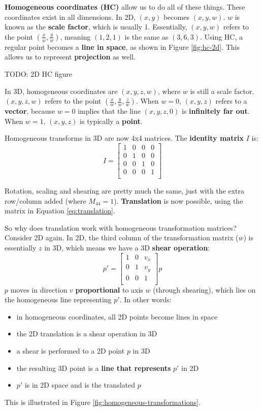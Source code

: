 \documentclass{article}
\begin{document}
\textbf{Homogeneous coordinates (HC)} allow us to do all of these things. These coordinates exist in all dimensions. In 2D, $(x, y)$ becomes $(x, y, w)$. $w$ is known as the \textbf{scale factor}, which is usually 1. Essentially, $(x, y, w)$ refers to the point $(\frac{x}{w}, \frac{y}{w})$, meaning $(1, 2, 1)$ is the same as $(3, 6, 3)$. Using HC, a regular point becomes a \textbf{line in space}, as shown in Figure \ref{fig:hc-2d}. This allows us to represent \textbf{projection} as well.

TODO: 2D HC figure

In 3D, homogeneous coordinates are $(x, y, z, w)$, where $w$ is still a scale factor. $(x, y, z, w)$ refers to the point $(\frac{x}{w}, \frac{y}{w},\frac{z}{w})$. When $w = 0$, $(x,y,z)$ refers to a \textbf{vector}, because $w = 0$ implies that the line $(x, y, z, 0)$ is \textbf{infinitely far out}. When $w = 1$, $(x, y, z)$ is typically a \textbf{point}.

Homogeneous transforms in 3D are now 4x4 matrices. The \textbf{identity matrix} $I$ is:
\begin{equation}
	I = \left[ \begin{matrix}
	1 & 0 & 0 & 0 \\
	0 & 1 & 0 & 0 \\
	0 & 0 & 1 & 0 \\
	0 & 0 & 0 & 1 \\
	\end{matrix} \right]
\end{equation}

Rotation, scaling and shearing are pretty much the same, just with the extra row/column added (where $M_{44} = 1$). \textbf{Translation} is now possible, using the matrix in Equation \ref{eq:translation}.

So why does translation work with homogeneous transformation matrices? Consider 2D again. In 2D, the third column of the transformation matrix ($w$) is essentially $z$ in 3D, which means we have a 3D \textbf{shear operation}:
\begin{equation}
p' = \left[ \begin{matrix}
	1 & 0 & v_x \\
	0 & 1 & v_y \\	
	0 & 0 & 1 \\
	\end{matrix} \right] p
\end{equation}
$p$ moves in direction $v$ \textbf{proportional} to axis $w$ (through shearing), which lies on the homogeneous line representing $p'$. In other words:
\begin{itemize}
	\item in homogeneous coordinates, all 2D points become lines in space
	\item the 2D translation is a shear operation in 3D
	\item a shear is performed to a 2D point $p$ in 3D
	\item the resulting 3D point is a \textbf{line that represents} $p'$ in 2D
	\item $p'$ is in 2D space and is the translated $p$
\end{itemize}
This is illustrated in Figure \ref{fig:homogeneous-transformations}.
\end{document}
